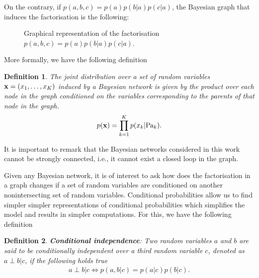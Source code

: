 \documentclass[11pt]{article}
\numberwithin{equation}{section}
\newcommand{\x}{{\bf x}}
\newtheorem{definition}{Definition}[section]
\begin{document}
On the contrary, if $p(a,b,c) = p(a)p(b \vert a)p(c \vert a)$, the Bayesian graph that induces the factorisation is the following:

\begin{figure}[h!]
	\centering
	
	\caption{Graphical representation of the factorisation $p(a,b,c) = p(a) p(b \vert a) p(c \vert a)$.}
	\label{fig:lds-gm}
\end{figure}


More formally, we have the following definition
\begin{definition}
	The joint distribution over a set of random variables $\x = (x_1, \ldots, x_K)$ induced by a Bayesian network is given by the product over each node in the graph conditioned on the variables corresponding to the parents of that node in the graph.
	\begin{equation}
		p({\bf x}) = \prod_{k=1}^K p(x_k \vert \text{Pa}_k).
	\end{equation}
\end{definition}

It is important to remark that the Bayesian networks considered in this work cannot be strongly connected, i.e., it cannot exist a closed loop in the graph.

Given any Bayesian network, it is of interest to ask how does the factorisation in a graph changes if a set of random variables are conditioned on another nonintersecting set of random variables. Conditional probabilities allow us to find simpler simpler representations of conditional probabilities which simplifies the model and results in simpler computations. For this, we have the following definition


\begin{definition}
	\textbf{Conditional independence}: Two random variables $a$ and $b$ are said to be conditionally independent over a third random variable $c$, denoted as $a \perp b \vert c$, if the following holds true
	\begin{align}
		a \perp b \vert c \iff p(a, b \vert c) = p(a \vert c) p(b \vert c).
	\end{align}
\end{definition}
\end{document}
